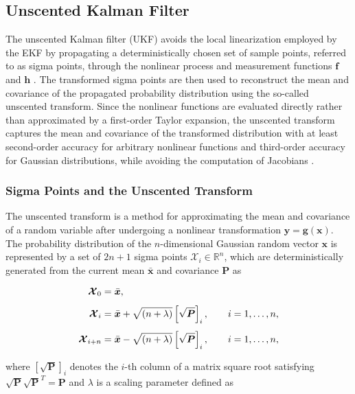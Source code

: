 \subsection{Unscented Kalman Filter}
\label{sec:2.4.2UKF}

The unscented Kalman filter (UKF) avoids the local linearization employed by the EKF by propagating a deterministically chosen set of sample points, referred to as sigma points, through the nonlinear process and measurement functions $\bm{f}$ and $\bm{h}$ \cite{Julier2004UKF}. The transformed sigma points are then used to reconstruct the mean and covariance of the propagated probability distribution using the so-called unscented transform. Since the nonlinear functions are evaluated directly rather than approximated by a first-order Taylor expansion, the unscented transform captures the mean and covariance of the transformed distribution with at least second-order accuracy for arbitrary nonlinear functions and third-order accuracy for Gaussian distributions, while avoiding the computation of Jacobians \cite{Julier2004UKF}.


\subsubsection{Sigma Points and the Unscented Transform}

The unscented transform is a method for approximating the mean and covariance of a random variable after undergoing a nonlinear transformation $\bm{y} = \bm{g}(\bm{x})$. 
The probability distribution of the $n$-dimensional Gaussian random vector $\bm{x}$ is represented by a set of $2n+1$ sigma points $\bm{\mathcal{X}}_i \in \mathbb{R}^n$, which are deterministically generated from the current mean $\bar{\bm{x}}$ and covariance $\bm{P}$ as \cite{Julier1997UKF}

\begin{align}
	\bm{\mathcal{X}}_0 &= \bar{\bm{x}},
	\notag\\[4pt]
	\bm{\mathcal{X}}_i &= \bar{\bm{x}} + \sqrt{(n+\lambda)} \left[ \sqrt{\bm{P}}\right]_i,
	\qquad i=1,\ldots,n,
	\notag\\[4pt]
	\bm{\mathcal{X}}_{i+n} &= \bar{\bm{x}} - \sqrt{(n+\lambda)} \left[ \sqrt{\bm{P}}\right]_i,
	\qquad i=1,\ldots,n,
	\label{eq:sigma_points}
\end{align}

where $[ \sqrt{\bm{P}} ]_i$ denotes the $i$-th column of a matrix square root satisfying $\sqrt{\bm{P}} \sqrt{\bm{P}}^T = \bm{P}$ and $\lambda$ is a scaling parameter defined as 

